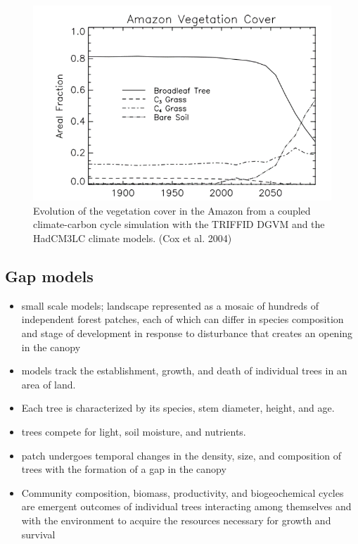 \documentclass[
  12pt,
  oneside]{book}
\providecommand{\tightlist}{%
  \setlength{\itemsep}{0pt}\setlength{\parskip}{0pt}}
\begin{document}
\begin{figure}

{\centering \includegraphics[width=0.8\linewidth]{figures/chap6/f68_amazon_dieback} 

}

\caption{Evolution of the vegetation cover in the Amazon from a coupled climate-carbon cycle simulation with the TRIFFID DGVM and the HadCM3LC climate models. (Cox et al. 2004)}\label{fig:f68}
\end{figure}

\hypertarget{gap-models}{%
\subsection{Gap models}\label{gap-models}}

\begin{itemize}
\tightlist
\item
  small scale models; landscape represented as a mosaic of hundreds of independent forest patches, each of which can differ in species composition and stage of development in response to disturbance that creates an opening in the canopy
\item
  models track the establishment, growth, and death of individual trees in an area of land.
\item
  Each tree is characterized by its species, stem diameter, height, and age.
\item
  trees compete for light, soil moisture, and nutrients.
\item
  patch undergoes temporal changes in the density, size, and composition of trees with the formation of a gap in the canopy
\item
  Community composition, biomass, productivity, and biogeochemical cycles are emergent outcomes of individual trees interacting among themselves and with the environment to acquire the resources necessary for growth and survival
\end{itemize}
\end{document}
